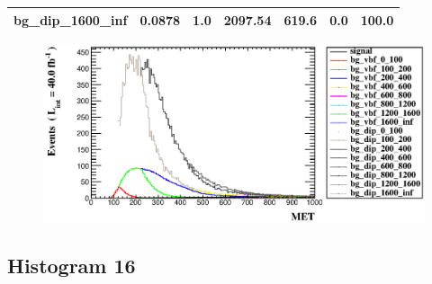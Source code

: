 \documentclass[a4paper, 10pt]{article}
\begin{document}
\begin{table}[H]
\begin{center}
\begin{tabular}{|m{23.0mm}|m{23.0mm}|m{18.0mm}|m{19.0mm}|m{19.0mm}|m{19.0mm}|m{19.0mm}|}
      \hline
      {\cellcolor{white}         bg\_dip\_1600\_inf}& {\cellcolor{white}         0.0878}& {\cellcolor{white}         1.0}& {\cellcolor{white}         2097.54}& {\cellcolor{white}         619.6}& {\cellcolor{red}         0.0}& {\cellcolor{red}         100.0}\\
\hline
    \end{tabular}
  \end{center}
\end{table}

\begin{figure}[H]
  \begin{center}
    \includegraphics[scale=0.45]{selection_14.eps}\\
\caption{   }
  \end{center}
\end{figure}
      \newpage
\subsection{ Histogram 16}
\end{document}
